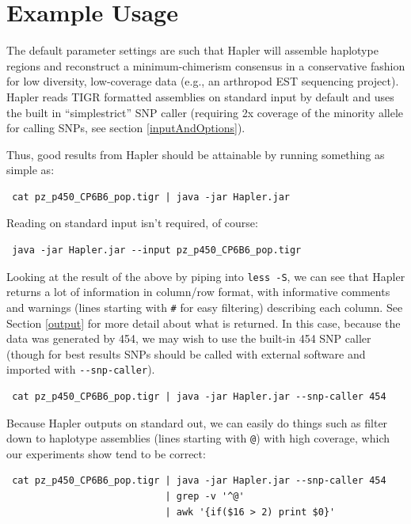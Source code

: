 \documentclass[11pt]{llncs}
\begin{document}
\section{Example Usage} 
\label{exampleUsage}

The default parameter settings are such that Hapler will assemble haplotype regions and reconstruct a minimum-chimerism consensus in a conservative 
fashion for low diversity, low-coverage data (e.g., an arthropod EST sequencing project). Hapler reads TIGR formatted assemblies on standard input by 
default and uses the built in ``simplestrict'' SNP caller (requiring 2x coverage of the minority allele for calling SNPs, see section \ref{inputAndOptions}).

Thus, good results from Hapler should be attainable by running something as simple as:

\begin{verbatim}
 cat pz_p450_CP6B6_pop.tigr | java -jar Hapler.jar
\end{verbatim}

Reading on standard input isn't required, of course:

\begin{verbatim}
 java -jar Hapler.jar --input pz_p450_CP6B6_pop.tigr
\end{verbatim}

Looking at the result of the above by piping into \verb=less -S=, we can see that Hapler returns a lot of information in column/row format, with 
informative comments and warnings (lines starting with \verb=#= for easy filtering) describing each column. See Section \ref{output} for more detail about what is 
returned. In this case, because the data was generated by 454, we may wish to use the built-in 454 SNP caller (though for best results SNPs should be
called with external software and imported with \verb=--snp-caller=).

\begin{verbatim}
 cat pz_p450_CP6B6_pop.tigr | java -jar Hapler.jar --snp-caller 454
\end{verbatim}


Because Hapler outputs on standard out, we can easily do things such as filter down to haplotype assemblies (lines starting with \texttt{@}) with high coverage, which our experiments show tend to be
correct:

\begin{verbatim}
 cat pz_p450_CP6B6_pop.tigr | java -jar Hapler.jar --snp-caller 454 
                            | grep -v '^@' 
                            | awk '{if($16 > 2) print $0}'
\end{verbatim}
\end{document}
